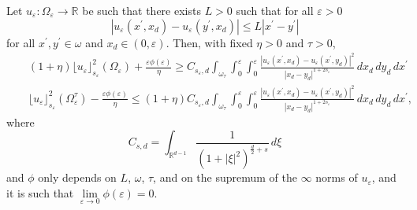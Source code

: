 \documentclass[10pt,a4paper]{amsart}
\def\e{\varepsilon}
\begin{document}
\begin{lemma}\label{vert-lemma}
Let $u_\e\colon\Omega_\e\to \mathbb R$ be such that there exists $L>0$ such that for all $\e>0$ 
\begin{equation}\label{equilip}
|u_\e(x^\prime, x_d)-u_\e(y^\prime, x_d)|\leq L|x^\prime-y^\prime|
\end{equation}
for all $x^\prime,y^\prime\in\omega$ and $x_d\in (0,\e)$. 
Then, with fixed $\eta>0$ and $\tau>0$,  
\begin{eqnarray}\label{vert-est1}
&&(1+\eta)\lfloor u_\e\rfloor_{s_\e}^2(\Omega_\e)+\frac{\e\phi(\e)}{\eta}\geq C_{s_\e,d} \int_{\omega_\tau}\int_0^\e\int_0^\e\frac{|u_\e(x^\prime, x_d)-u_\e(x^\prime, y_d)|^2}{|x_d-y_d|^{1+2s_\e}}\, dx_d\, dy_d\, dx^\prime\qquad \\
&&\lfloor u_\e\rfloor_{s_\e}^2(\Omega^\tau_\e)-\frac{\e\phi(\e)}{\eta}\leq (1+\eta)C_{s_\e,d} \int_{\omega_\tau}\int_0^\e\int_0^\e\frac{|u_\e(x^\prime, x_d)-u_\e(x^\prime, y_d)|^2}{|x_d-y_d|^{1+2s_\e}}\, dx_d\, dy_d\, dx^\prime,\qquad \label{vert-est2}
\end{eqnarray}
where 
\begin{equation}\label{defC}
C_{s,d}=\int_{\mathbb R^{d-1}}
\frac{1}{(1+|\xi|^2)^{\frac{d}{2}+s}}\, d\xi 
\end{equation}
and $\phi$ only depends on $L$, $\omega$, $\tau$, and on the supremum of the $\infty$ norms of $u_\e$, and it is such that $\lim\limits_{\e\to 0}\phi(\e)=0$. 
\end{lemma}
\end{document}
